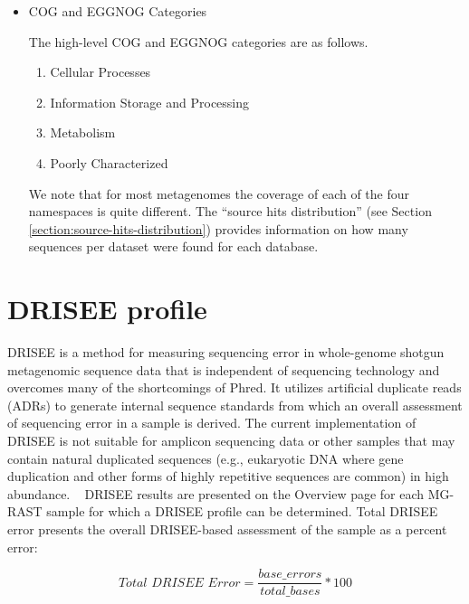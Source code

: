 \documentclass[12pt,fullpage]{report}
\begin{document}
\begin{itemize}
\item COG and EGGNOG Categories

The high-level COG and EGGNOG categories are as follows.
\begin{enumerate}
\item Cellular Processes
\item Information Storage and Processing
\item Metabolism
\item Poorly Characterized
\end{enumerate}

We note that for most metagenomes the coverage of each of the four namespaces is quite different. The ``source hits distribution'' (see Section \ref{section:source-hits-distribution}) provides information on how many sequences per dataset
were found for each database.
\end{itemize}

\section{DRISEE profile}
\label{DRISEEDETAIL}

DRISEE \cite{DRISEE} is a method for measuring sequencing error in whole-genome shotgun metagenomic sequence data that is independent of sequencing technology and overcomes many of the shortcomings of Phred. It utilizes artificial duplicate reads (ADRs) to generate internal sequence standards from which an overall assessment of sequencing error in a sample is derived.
The current implementation of DRISEE is not suitable for amplicon sequencing data or other samples that may contain natural duplicated sequences (e.g., eukaryotic DNA where gene duplication and other forms of highly repetitive sequences are common) in high abundance.
\
DRISEE results are presented on the Overview page for each MG-RAST sample for which a DRISEE profile can be determined.
Total DRISEE error presents the overall DRISEE-based assessment of the sample as a percent error:

\begin{small}
$$Total \,\, DRISEE \,\, Error = \frac{base\_errors}{total\_bases} * 100$$
\end{small}
\end{document}
